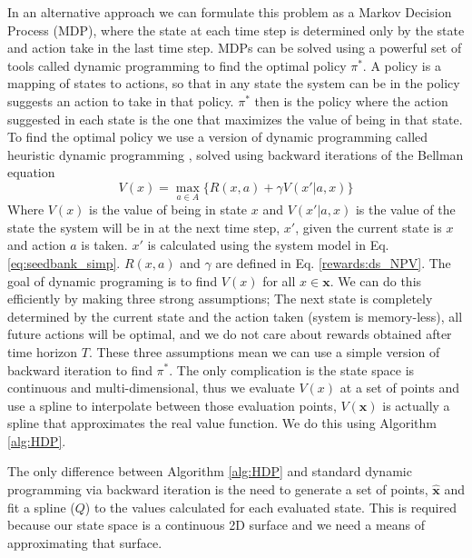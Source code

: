 \documentclass[12pt, a4paper]{article}
\begin{document}
In an alternative approach we can formulate this problem as a Markov Decision Process (MDP), where the state at each time step is determined only by the state and action take in the last time step. MDPs can be solved using a powerful set of tools called dynamic programming to find the optimal policy $\pi^*$. A policy is a mapping of states to actions, so that in any state the system can be in the policy suggests an action to take in that policy. $\pi^*$ then is the policy where the action suggested in each state is the one that maximizes the value of being in that state. To find the optimal policy we use a version of dynamic programming called heuristic dynamic programming \citep{Werb1992}, solved using backward iterations of the Bellman equation 
\begin{equation}\label{eq:bellman}
	V(x) = \max\limits_{a \in A}\lbrace R(x, a) + \gamma V(x'|a, x) \rbrace 
\end{equation}                  
Where $V(x)$ is the value of being in state $x$ and $V(x'|a, x)$ is the value of the state the system will be in at the next time step, $x'$, given the current state is $x$ and action $a$ is taken. $x'$ is calculated using the system model in Eq. \ref{eq:seedbank_simp}. $R(x, a)$ and $\gamma$ are defined in Eq. \ref{rewards:ds_NPV}. The goal of dynamic programing is to find $V(x)$ for all $x \in \mathbf{x}$. We can do this efficiently by making three strong assumptions; The next state is completely determined by the current state and the action taken (system is memory-less), all future actions will be optimal, and we do not care about rewards obtained after time horizon $T$. These three assumptions mean we can use a simple version of backward iteration to find $\pi^*$. The only complication is the state space is continuous and multi-dimensional, thus we evaluate $V(x)$ at a set of points and use a spline to interpolate between those evaluation points, $V(\mathbf{x})$ is actually a spline that approximates the real value function. We do this using Algorithm \ref{alg:HDP}.

The only difference between Algorithm \ref{alg:HDP} and standard dynamic programming via backward iteration is the need to generate a set of points, $\hat{\mathbf{x}}$ and fit a spline ($Q$) to the values calculated for each evaluated state. This is required because our state space is a continuous 2D surface and we need a means of approximating that surface.
\end{document}
